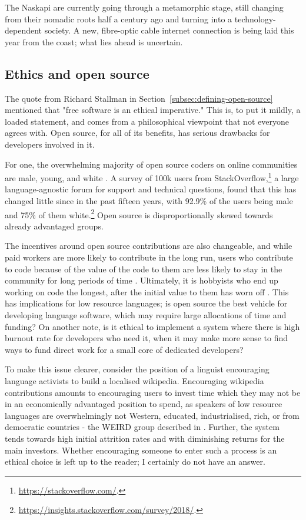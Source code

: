 The Naskapi are currently going through a metamorphic stage, still changing from their nomadic roots half a century ago and turning into a technology-dependent society. A new, fibre-optic cable internet connection is being laid this year from the coast; what lies ahead is uncertain.

\subsection{Ethics and open source}
\label{subsec:oss-ethics}

The quote from Richard Stallman in Section~\ref{subsec:defining-open-source} mentioned that "free software is an ethical imperative." This is, to put it mildly, a loaded statement, and comes from a philosophical viewpoint that not everyone agrees with. Open source, for all of its benefits, has serious drawbacks for developers involved in it.

For one, the overwhelming majority of open source coders on online communities are male, young, and white \citep{ghosh2002free}. A survey of 100k users from StackOverflow,\footnote{\href{https://stackoverflow.com/}{https://stackoverflow.com/}. } a large language-agnostic forum for support and technical questions, found that this has changed little since in the past fifteen years, with 92.9\% of the users being male and 75\% of them white.\footnote{\href{https://insights.stackoverflow.com/survey/2018/}{https://insights.stackoverflow.com/survey/2018/}. } Open source is disproportionally skewed towards already advantaged groups.

The incentives around open source contributions are also changeable, and while paid workers are more likely to contribute in the long run, users who contribute to code because of the value of the code to them are less likely to stay in the community for long periods of time \citep{roberts2006understanding, shah2006motivation}. Ultimately, it is hobbyists who end up working on code the longest, after the initial value to them has worn off \citep{shah2006motivation}. This has implications for low resource languages; is open source the best vehicle for developing language software, which may require large allocations of time and funding? On another note, is it ethical to implement a system where there is high burnout rate for developers who need it, when it may make more sense to find ways to fund direct work for a small core of dedicated developers?

To make this issue clearer, consider the position of a linguist encouraging language activists to build a localised wikipedia. Encouraging wikipedia contributions amounts to encouraging users to invest time which they may not be in an economically advantaged position to spend, as speakers of low resource languages are overwhelmingly not Western, educated, industrialised, rich, or from democratic countries - the WEIRD group described in \citet{henrich2010most}. Further, the system tends towards high initial attrition rates and with diminishing returns for the main investors. Whether encouraging someone to enter such a process is an ethical choice is left up to the reader; I certainly do not have an answer.


